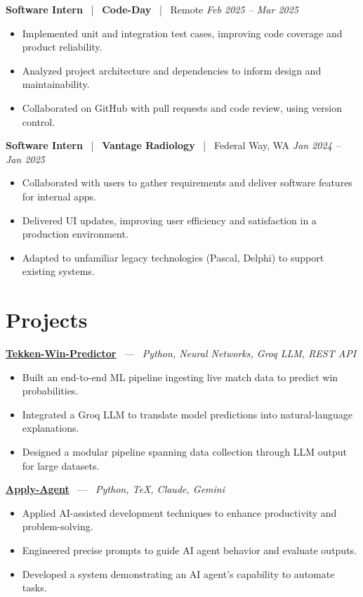 \documentclass[10pt, letterpaper]{article}
\newcommand{\jobhead}[4]{%
  \vspace{5pt}%
  {\bfseries\color{dark}#1}%
  ~{\color{light}|}~%
  {\bfseries\color{navy}#2}%
  ~{\color{light}|}~%
  {\color{light}#3}%
  \hfill{\color{light}\small\textit{#4}}\\[-2pt]%
}
\newcommand{\projhead}[3]{%
  \vspace{5pt}%
  {\bfseries\color{dark}\href{#2}{#1}}%
  ~{\color{light}---}~%
  {\color{light}\small\textit{#3}}\\[-2pt]%
}
\begin{document}
\jobhead{Software Intern}{Code-Day}{Remote}{Feb 2025 – Mar 2025}
\begin{itemize}
  \item Implemented unit and integration test cases, improving code coverage and product reliability.
  \item Analyzed project architecture and dependencies to inform design and maintainability.
  \item Collaborated on GitHub with pull requests and code review, using version control.
\end{itemize}

\jobhead{Software Intern}{Vantage Radiology}{Federal Way, WA}{Jan 2024 – Jan 2025}
\begin{itemize}
  \item Collaborated with users to gather requirements and deliver software features for internal apps.
  \item Delivered UI updates, improving user efficiency and satisfaction in a production environment.
  \item Adapted to unfamiliar legacy technologies (Pascal, Delphi) to support existing systems.
\end{itemize}

\section{Projects}

\projhead{Tekken-Win-Predictor}{}{Python, Neural Networks, Groq LLM, REST API}
\begin{itemize}
  \item Built an end-to-end ML pipeline ingesting live match data to predict win probabilities.
  \item Integrated a Groq LLM to translate model predictions into natural-language explanations.
  \item Designed a modular pipeline spanning data collection through LLM output for large datasets.
\end{itemize}

\projhead{Apply-Agent}{https://github.com/timmyd4/apply-agent}{Python, TeX, Claude, Gemini}
\begin{itemize}
  \item Applied AI-assisted development techniques to enhance productivity and problem-solving.
  \item Engineered precise prompts to guide AI agent behavior and evaluate outputs.
  \item Developed a system demonstrating an AI agent's capability to automate tasks.
\end{itemize}
\end{document}
